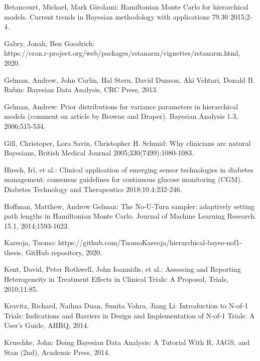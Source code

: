 \documentclass[12pt,a4paper,leqno]{report}
\theoremstyle{plain}
\theoremstyle{definition}
\theoremstyle{remark}
\begin{document}
\begin{thebibliography}{4}
 
    Betancourt, Michael, Mark Girolami: Hamiltonian Monte Carlo for hierarchical models.
    Current trends in Bayesian methodology with applications 79.30 2015;2-4.

    Gabry, Jonah, Ben Goodrich: \\
    https://cran.r-project.org/web/packages/rstanarm/vignettes/rstanarm.html, 2020.
   
    Gelman, Andrew, John Carlin, Hal Stern, David Dunson, Aki Vehtari, Donald B.
    Rubin: Bayesian Data Analysis, CRC Press, 2013.

    Gelman, Andrew: Prior distributions for variance parameters in hierarchical models
    (comment on article by Browne and Draper). Bayesian Analysis 1.3, 2006;515-534.
    
    Gill, Christoper, Lora Savin, Christopher H. Schmid: Why clinicians are
    natural Bayesians, British Medical Journal 2005;330(7499):1080-1083.
    
    Hirsch, Irl, et al.: Clinical application of emerging sensor technologies
    in diabetes management: consensus guidelines for continuous glucose
    monitoring (CGM). Diabetes Technology and Therapeutics 2018;10.4:232-246.

    Hoffman, Matthew, Andrew Gelman: The No-U-Turn sampler: adaptively setting path
    lengths in Hamiltonian Monte Carlo. Journal of Machine Learning Research. 15.1,
    2014;1593-1623.

    Kareoja, Tuomo: https://github.com/TuomoKareoja/hierarchical-bayes-nof1-thesis,
    GitHub repository, 2020.
 
    Kent, David, Peter Rothwell, John Ioannidis, et al.: Assessing and Reporting Heterogeneity in
    Treatment Effects in Clinical Trials: A Proposal, Trials, 2010;11:85.

    Kravitz, Richard, Naihua Duan, Sunita Vohra, Jiang Li: Introduction to
    N-of-1 Trials: Indications and Barriers in Design and Implementation of
    N-of-1 Trials: A User's Guide, AHRQ, 2014.
    
    Kruschke, John: Doing Bayesian Data Analysis: A Tutorial With R, JAGS, and Stan
    (2nd), Academic Press, 2014.
    

\end{thebibliography}
\end{document}
